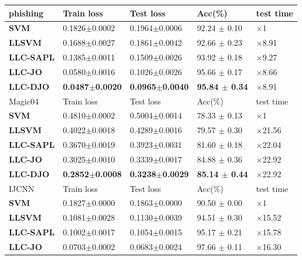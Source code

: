 \documentclass{llncs}
\begin{document}
	\begin{table}
		\begin{tabu} to \textwidth {|X[c]| X[c]| X[c]| X[c]| X[c]|}
			\hline
			phishing              & Train loss & Test loss & Acc(\%) &test time \\
			\hline
			\textbf{SVM} 		   	&0.1826$\pm$0.0002  &0.1964$\pm$0.0006  & 92.24 $\pm$ 0.10 & $\times$1  \\ \hline
			\textbf{LLSVM}     		&0.1688$\pm$0.0027  &0.1861$\pm$0.0042  & 92.66 $\pm$ 0.23 & $\times$8.91 \\ \hline
			\textbf{LLC-SAPL}       &0.1385$\pm$0.0011  &0.1509$\pm$0.0026  & 93.92 $\pm$ 0.18 & $\times$9.27 \\ \hline
			\textbf{LLC-JO}         &0.0580$\pm$0.0016  &0.1026$\pm$0.0026  & 95.66 $\pm$ 0.17 & $\times$8.66 \\ \hline
			\textbf{LLC-DJO}         &\textbf{0.0487$\pm$0.0020}  &\textbf{0.0965$\pm$0.0040}  & \textbf{95.84 $\pm$ 0.34} &$\times$8.91 \\ \hline
			\hline
			Magic04              & Train loss & Test loss & Acc(\%) &test time \\
			\hline
			\textbf{SVM} 		   	&0.4810$\pm$0.0002  &0.5004$\pm$0.0014  &78.33 $\pm$ 0.13  &$\times$1 \\ \hline
			\textbf{LLSVM}     		&0.4022$\pm$0.0018  &0.4289$\pm$0.0016  &79.57 $\pm$ 0.30  &$\times$21.56 \\ \hline
			\textbf{LLC-SAPL}       &0.3670$\pm$0.0019  &0.3923$\pm$0.0031  &81.60 $\pm$ 0.18  &$\times$22.04 \\ \hline
			\textbf{LLC-JO}         &0.3025$\pm$0.0010  &0.3339$\pm$0.0017  &84.88 $\pm$ 0.36  &$\times$22.92\\ \hline
			\textbf{LLC-DJO}         &\textbf{0.2852$\pm$0.0008}  &\textbf{0.3238$\pm$0.0029}  &\textbf{85.14 $\pm$ 0.44}   &$\times$22.92\\ \hline
			\hline
			IJCNN              & Train loss & Test loss & Acc(\%) &test time\\
			\hline
			\textbf{SVM} 		   	&0.1827$\pm$0.0000  &0.1863$\pm$0.0000  & 90.50 $\pm$ 0.00  &$\times$1\\ \hline
			\textbf{LLSVM}     		&0.1081$\pm$0.0028  &0.1130$\pm$0.0039  & 94.51 $\pm$ 0.30  &$\times$15.52\\ \hline
			\textbf{LLC-SAPL}       &0.1002$\pm$0.0017  &0.1054$\pm$0.0015  & 95.17 $\pm$ 0.21  &$\times$15.78\\ \hline
			\textbf{LLC-JO}         &0.0703$\pm$0.0002  &0.0683$\pm$0.0024  & 97.66 $\pm$ 0.11  &$\times$16.30\\ \hline

\end{tabu}
\end{table}
\end{document}
